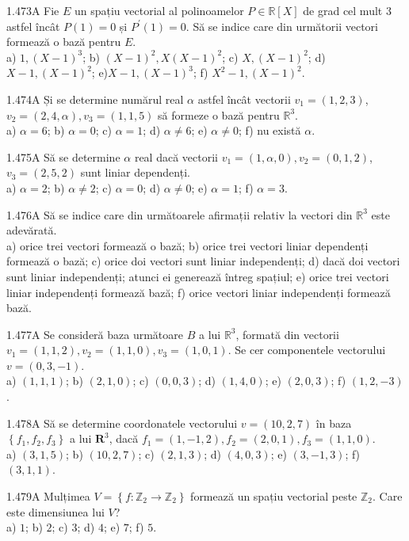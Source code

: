 \documentclass[11pt]{article}
\begin{document}
1.473A Fie $E$ un spațiu vectorial al polinoamelor $P \in \mathbb{R}[X]$ de grad cel mult 3 astfel încât $P(1)=0$ și $P^{\prime}(1)=0$. Să se indice care din următorii vectori formează o bază pentru $E$.\\ a) $1,(X-1)^{3}$; b) $(X-1)^{2}, X(X-1)^{2}$; c) $X,(X-1)^{2}$; d) $X-1,(X-1)^{2}$; e)$X-1,(X-1)^{3}$; f) $X^{2}-1,(X-1)^{2}$.

1.474A Și se determine numărul real $\alpha$ astfel încât vectorii $v_{1}=(1,2,3)$, $v_{2}=(2,4, \alpha), v_{3}=(1,1,5)$ să formeze o bază pentru $\mathbb{R}^{3}$.\\ a) $\alpha=6$; b) $\alpha=0$; c) $\alpha=1$; d) $\alpha \neq 6$; e) $\alpha \neq 0$; f) nu există $\alpha$.

1.475A Să se determine $\alpha$ real dacă vectorii $v_{1}=(1, \alpha, 0), v_{2}=(0,1,2)$, $v_{3}=(2,5,2)$ sunt liniar dependenți.\\ a) $\alpha=2$; b) $\alpha \neq 2$; c) $\alpha=0$; d) $\alpha \neq 0$; e) $\alpha=1$; f) $\alpha=3$.

1.476A Să se indice care din următoarele afirmații relativ la vectori din $\mathbb{R}^{3}$ este adevărată.\\ a) orice trei vectori formează o bază; b) orice trei vectori liniar dependenți formează o bază; c) orice doi vectori sunt liniar independenți; d) dacă doi vectori sunt liniar independenți; atunci ei generează întreg spațiul; e) orice trei vectori liniar independenți formează bază; f) orice vectori liniar independenți formează bază.

1.477A Se consideră baza următoare $B$ a lui $\mathbb{R}^{3}$, formată din vectorii $v_{1}=(1,1,2), v_{2}=(1,1,0), v_{3}=(1,0,1)$. Se cer componentele vectorului $v=(0,3,-1)$.\\ a) $(1,1,1)$; b) $(2,1,0)$; c) $(0,0,3)$; d) $(1,4,0)$; e) $(2,0,3)$; f) $(1,2,-3)$.

1.478A Să se determine coordonatele vectorului $v=(10,2,7)$ în baza $\left\{f_{1}, f_{2}, f_{3}\right\}$ a lui $\boldsymbol{R}^{3}$, dacă $f_{1}=(1,-1,2), f_{2}=(2,0,1), f_{3}=(1,1,0)$.\\ a) $(3,1,5)$; b) $(10,2,7)$; c) $(2,1,3)$; d) $(4,0,3)$; e) $(3,-1,3)$; f) $(3,1,1)$.

1.479A Mulțimea $V=\left\{f: \mathbb{Z}_{2} \rightarrow \mathbb{Z}_{2}\right\}$ formează un spațiu vectorial peste $\mathbb{Z}_{2}$. Care este dimensiunea lui $V$?\\ a) $1$; b) $2$; c) $3$; d) $4$; e) $7$; f) $5$.
\end{document}
